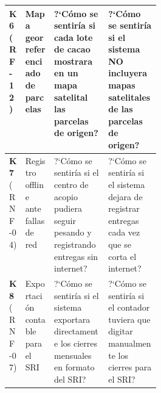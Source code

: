 \begin{table}[htbp]
\begin{tabularx}{\linewidth}{|p{0.10\linewidth}|p{0.19\linewidth}|Y|Y|}
\hline
{} \textbf{K6} (RF-12) & Mapa georreferenciado de parcelas & ?`C\'omo se sentir\'ia si cada lote de cacao mostrara en un mapa satelital las parcelas de origen? & ?`C\'omo se sentir\'ia si el sistema NO incluyera mapas satelitales de las parcelas de origen?\\
\hline
\textbf{K7} (RNF-04) & Registro offline ante fallas de red & ?`C\'omo se sentir\'ia si el centro de acopio pudiera seguir pesando y registrando entregas sin internet? & ?`C\'omo se sentir\'ia si el sistema dejara de registrar entregas cada vez que se corta el internet?\\
\hline
{} \textbf{K8} (RNF-07) & Exportaci\'on contable para el SRI & ?`C\'omo se sentir\'ia si el sistema exportara directamente los cierres mensuales en formato del SRI? & ?`C\'omo se sentir\'ia si el contador tuviera que digitar manualmente los cierres para el SRI?\\
\hline
\end{tabularx}
\end{table}
